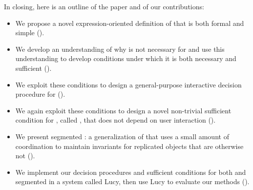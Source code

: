 In closing, here is an outline of the paper and of our contributions:
\begin{itemize}
  \item
    We propose a novel expression-oriented definition of \invariantconfluence{}
    that is both formal and simple ().

  \item
    We develop an understanding of why \invariantclosure{} is not necessary for
    \invariantconfluence{} and use this understanding to develop conditions
    under which it is both necessary and sufficient
    ().

  \item
    We exploit these conditions to design a general-purpose interactive
    decision procedure for \invariantconfluence{}
    ().

  \item
    We again exploit these conditions to design a novel non-trivial sufficient
    condition for \invariantconfluence{}, called \mergereducibility, that does
    not depend on user interaction ().

  \item
    We present segmented \invariantconfluence{}: a generalization of
    \invariantconfluence{} that uses a small amount of coordination to maintain
    invariants for replicated objects that are otherwise not
    \invariantconfluent{} ().

  \item
    We implement our decision procedures and sufficient conditions for both
    \invariantconfluence{} and segmented \invariantconfluence{} in a system
    called Lucy, then use Lucy to evaluate our methods ().
\end{itemize}
